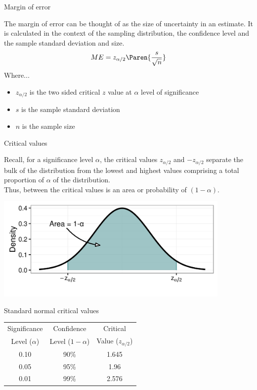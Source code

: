 \documentclass[xcolor=table, aspectratio=169, bigger, handout]{beamer}
\begin{document}
\begin{frame}{Margin of error}
\begin{block}{}
The margin of error can be thought of as the size of uncertainty in an estimate. It is calculated in the context of the sampling distribution, the confidence level and the sample standard deviation and size.
\pause\[ME = z_{\alpha/2} \Paren{\frac s {\sqrt n}}\]
Where...
\begin{itemize}
\item $z_{\alpha/2}$ is the two sided critical $z$ value at $\alpha$ level of significance  
\item $s$ is the sample standard deviation
\item $n$ is the sample size
\end{itemize}
\end{block}
\end{frame}

\begin{frame}{Critical values}
\begin{block}{}
Recall, for a significance level $\alpha$, the critical values $z_{\alpha/2}$ and $-z_{\alpha/2}$ separate the bulk of the distribution from the lowest and highest values comprising a total proportion of $\alpha$ of the distribution.\\
\medskip
Thus, between the critical values is an area or probability of $(1-\alpha)$. 
\end{block}
\medskip
{\centering
\includegraphics[width=4.5in]{../images/ch7_crit_values}
\par}
\end{frame}

\begin{frame}{Standard normal critical values}
\begin{block}{}
{\centering
\begin{tabular}{c | c | c }
Significance & Confidence & Critical \\
Level ($\alpha$) & Level ($1-\alpha$)  & Value ($z_{\alpha/2}$)\\
\hline
0.10 & 90\% &  1.645\\
0.05 & 95\% & 1.96 \\
0.01 & 99\% & 2.576
\end{tabular}
\par}
\end{block}
\end{frame}
\end{document}
